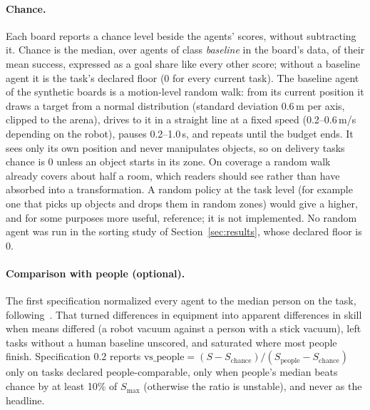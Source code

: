 \documentclass[11pt]{article}
\begin{document}
\paragraph{Chance.} Each board reports a chance level beside the agents' scores, without subtracting
it. Chance is the median, over agents of class \emph{baseline} in the board's data, of their mean
success, expressed as a goal share like every other score; without a baseline agent it is the task's
declared floor (0 for every current task). The baseline agent of the synthetic boards is a
motion-level random walk: from its current position it draws a target from a normal distribution
(standard deviation 0.6\,m per axis, clipped to the arena), drives to it in a straight line at a fixed
speed (0.2--0.6\,m/s depending on the robot), pauses 0.2--1.0\,s, and repeats until the budget ends.
It sees only its own position and never manipulates objects, so on delivery tasks chance is 0 unless
an object starts in its zone. On coverage a random walk already covers about half a room, which
readers should see rather than have absorbed into a transformation. A random policy at the task level
(for example one that picks up objects and drops them in random zones) would give a higher, and for
some purposes more useful, reference; it is not implemented. No random agent was run in the sorting
study of Section~\ref{sec:results}, whose declared floor is 0.

\paragraph{Comparison with people (optional).} The first specification normalized every agent to the
median person on the task, following~\cite{mnih2015}. That turned differences in equipment into
apparent differences in skill when means differed (a robot vacuum against a person with a stick
vacuum), left tasks without a human baseline unscored, and saturated where most people finish.
Specification 0.2 reports
$\mathrm{vs\_people}=(S-S_{\text{chance}})/(S_{\text{people}}-S_{\text{chance}})$ only on tasks
declared people-comparable, only when people's median beats chance by at least 10\% of $S_{\max}$
(otherwise the ratio is unstable), and never as the headline.
\end{document}
